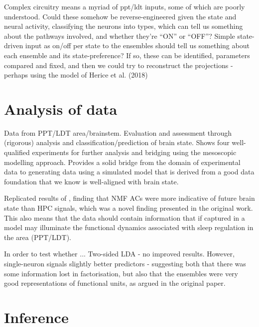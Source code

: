 \documentclass[mphil,deptreport,ai]{infthesis} %
\begin{document}
Complex circuitry means a myriad of ppt/ldt inputs, some of which are poorly understood.
Could these somehow be reverse-engineered given the state and neural activity, classifying the neurons into types, which can tell us something about the pathways involved, and whether they’re “ON” or “OFF”?
Simple state-driven input as on/off per state to the ensembles should tell us something about each ensemble and its state-preference? If so, these can be identified, parameters compared and fixed, and then we could try to reconstruct the projections - perhaps using the model of Herice et al. (2018)


\section{Analysis of data}
Data from PPT/LDT area/brainstem. Evaluation and assessment through (rigorous) analysis and classification/prediction of brain state. Shows four well-qualified experiments for further analysis and bridging using the mesoscopic modelling approach.
Provides a solid bridge from the domain of experimental data to generating data using a simulated model that is derived from a good data foundation that we know is well-aligned with brain state.



Replicated results of \cite{Tsunematsu2019}, finding that NMF ACs were more indicative of future brain state than HPC signals, which was a novel finding presented in the original work.
This also means that the data should contain information that if captured in a model may illuminate the functional dynamics associated with sleep regulation in the area (PPT/LDT).

In order to test whether ...
Two-sided LDA - no improved results.
However, single-neuron signals slightly better predictors - suggesting both that there was some information lost in factorisation, but also that the ensembles were very good representations of functional units, as argued in the original paper.


\section{Inference}
\end{document}
